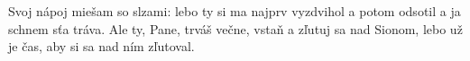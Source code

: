 Svoj nápoj miešam so slzami:
lebo ty si ma najprv vyzdvihol a potom odsotil
a ja schnem sťa tráva.
Ale ty, Pane, trváš večne,
vstaň a zľutuj sa nad Sionom,
lebo už je čas, aby si sa nad ním zľutoval.
